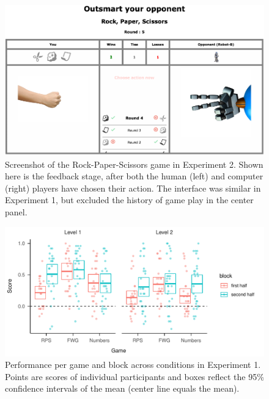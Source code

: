 \documentclass[smallextended]{svjour3}       %
\begin{document}
\begin{figure}

{\centering \includegraphics[width=\textwidth]{../images/feedback_rps} 

}

\caption{Screenshot of the Rock-Paper-Scissors game in Experiment 2. Shown here is the feedback stage, after both the human (left) and computer (right) players have chosen their action. The interface was similar in Experiment 1, but excluded the history of game play in the center panel.}\label{fig:feedback-rps-exp2}
\end{figure}

\begin{figure}

{\centering \includegraphics[width=\textwidth]{CBB_v2_files/figure-latex/exp1-avg-scores-game-1} 

}

\caption{Performance per game and block across conditions in Experiment 1. Points are scores of individual participants and boxes reflect the 95\% confidence intervals of the mean (center line equals the mean).}\label{fig:exp1-avg-scores-game}
\end{figure}
\end{document}
